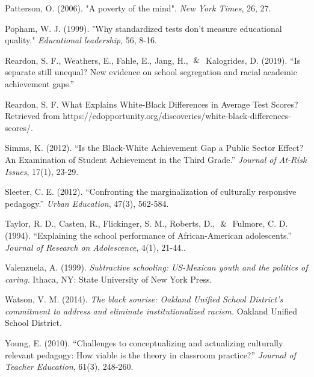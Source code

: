 \begin{hangparas}{.25in}{1}
Patterson, O. (2006). "A poverty of the mind". \textit{New York Times}, 26, 27.

Popham, W. J. (1999). "Why standardized tests don't measure educational quality." \textit{Educational leadership}, 56, 8-16.

Reardon, S. F., Weathers, E., Fahle, E., Jang, H., $\And$ Kalogrides, D. (2019). “Is separate still unequal? New evidence on school segregation and racial academic achievement gaps.”

Reardon, S. F. What Explains White-Black Differences in Average Test Scores? Retrieved from https://edopportunity.org/discoveries/white-black-differences-scores/.

Simms, K. (2012). “Is the Black-White Achievement Gap a Public Sector Effect? An Examination of Student Achievement in the Third Grade.” \textit{Journal of At-Risk Issues}, 17(1), 23-29.

Sleeter, C. E. (2012). “Confronting the marginalization of culturally responsive pedagogy.” \textit{Urban Education}, 47(3), 562-584.

Taylor, R. D., Casten, R., Flickinger, S. M., Roberts, D., $\And$ Fulmore, C. D. (1994). “Explaining the school performance of African-American adolescents.” \textit{Journal of Research on Adolescence}, 4(1), 21-44..

Valenzuela, A. (1999). \textit{Subtractive schooling: US-Mexican youth and the politics of caring.} Ithaca, NY: State University of New York Press.

Watson, V. M. (2014). \textit{The black sonrise: Oakland Unified School District’s commitment to address and eliminate institutionalized racism.} Oakland Unified School District. 

Young, E. (2010). “Challenges to conceptualizing and actualizing culturally relevant pedagogy: How viable is the theory in classroom practice?” \textit{Journal of Teacher Education}, 61(3), 248-260.
\end{hangparas}